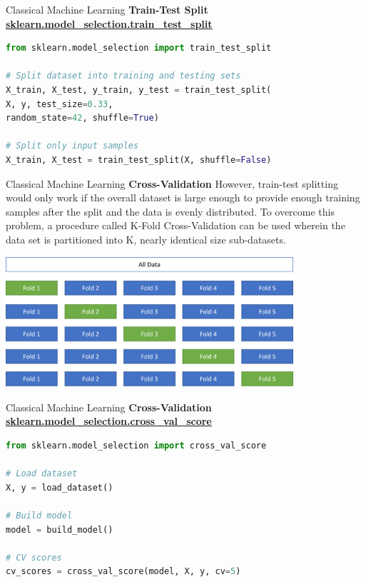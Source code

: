 \documentclass{beamer}
\begin{document}
\begin{frame}[fragile]{Classical Machine Learning}
    \textbf{Train-Test Split}
    \href{https://scikit-learn.org/stable/modules/generated/sklearn.model_selection.train_test_split.html}{\textbf{\underline{sklearn.model\_selection.train\_test\_split}}}
    \begin{example}
        \begin{lstlisting}[language=Python]
from sklearn.model_selection import train_test_split

# Split dataset into training and testing sets
X_train, X_test, y_train, y_test = train_test_split(
X, y, test_size=0.33,
random_state=42, shuffle=True)

# Split only input samples
X_train, X_test = train_test_split(X, shuffle=False)
        \end{lstlisting}
    \end{example}
\end{frame}
\begin{frame}[fragile]{Classical Machine Learning}
    \textbf{Cross-Validation}
    However, train-test splitting would only work if the overall dataset is large enough to provide enough training samples after the split and the data is evenly distributed. To overcome this problem, a procedure called K-Fold Cross-Validation can be used wherein the data set is partitioned into K, nearly identical size sub-datasets.
    \begin{center}
        \includegraphics[width=0.8\textwidth,height=\textheight,keepaspectratio]{figures/CV.png}
    \end{center}
\end{frame}
\begin{frame}[fragile]{Classical Machine Learning}
    \textbf{Cross-Validation}
    \href{https://scikit-learn.org/stable/modules/generated/sklearn.model_selection.cross_val_score.html}{\textbf{\underline{sklearn.model\_selection.cross\_val\_score}}}
    \begin{example}
        \begin{lstlisting}[language=Python]
from sklearn.model_selection import cross_val_score

# Load dataset
X, y = load_dataset()

# Build model
model = build_model()

# CV scores
cv_scores = cross_val_score(model, X, y, cv=5)
        \end{lstlisting}
    \end{example}
\end{frame}
\end{document}
